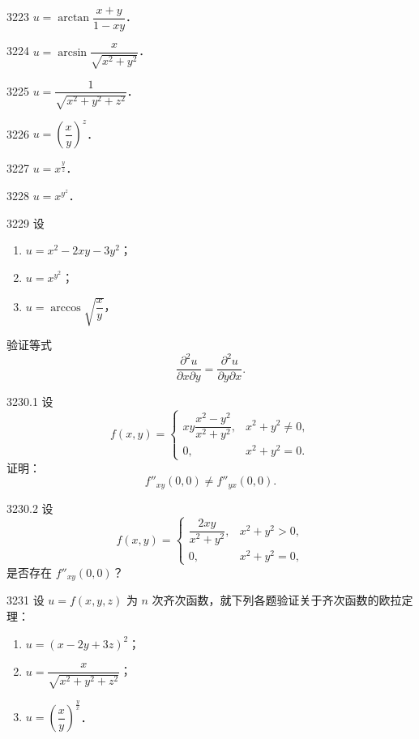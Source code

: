 \begin{prob}[S]{3223}
$u = \arctan\dfrac{x+y}{1-xy}$．
\end{prob}

\begin{prob}[S]{3224}
$u = \arcsin\dfrac{x}{\sqrt{x^2+y^2}}$．
\end{prob}

\begin{prob}[S]{3225}
$u = \dfrac{1}{\sqrt{x^2+y^2+z^2}}$．
\end{prob}

\begin{prob}[S]{3226}
$u = \left(\dfrac{x}{y}\right)^z$．
\end{prob}

\begin{prob}[S]{3227}
$u = x^{\frac{y}{z}}$．
\end{prob}

\begin{prob}[S]{3228}
$u = x^{y^z}$．
\end{prob}

\begin{prob}[L]{3229}
设
\begin{enumerate}[label=(\alph*), itemsep=2pt, topsep=3pt]
\item $u = x^2 - 2xy - 3y^2$；
\item $u = x^{y^2}$；
\item $u = \arccos\sqrt{\dfrac{x}{y}}$，
\end{enumerate}
验证等式
\[
\frac{\partial^2 u}{\partial x\partial y} = \frac{\partial^2 u}{\partial y\partial x}.
\]
\end{prob}

\begin{prob}[M]{3230.1}
设
\[
f(x,y) = \begin{cases} xy\dfrac{x^2-y^2}{x^2+y^2}, & x^2+y^2 \neq 0, \\ 0, & x^2+y^2 = 0. \end{cases}
\]
证明：
\[
f''_{xy}(0,0) \neq f''_{yx}(0,0).
\]
\end{prob}

\begin{prob}[M]{3230.2}
设
\[
f(x,y) = \begin{cases} \dfrac{2xy}{x^2+y^2}, & x^2+y^2 > 0, \\ 0, & x^2+y^2 = 0, \end{cases}
\]
是否存在 $f''_{xy}(0,0)$？
\end{prob}

\begin{prob}[L]{3231}
设 $u = f(x,y,z)$ 为 $n$ 次齐次函数，就下列各题验证关于齐次函数的欧拉定理：
\begin{enumerate}[label=(\alph*), itemsep=2pt, topsep=3pt]
\item $u = (x-2y+3z)^2$；
\item $u = \dfrac{x}{\sqrt{x^2+y^2+z^2}}$；
\item $u = \left(\dfrac{x}{y}\right)^{\frac{y}{x}}$．
\end{enumerate}
\end{prob}

